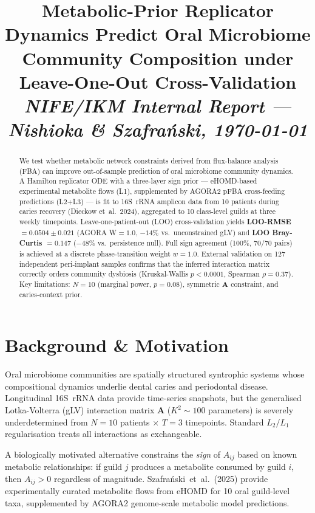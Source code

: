 \documentclass[10pt,a4paper]{article}
\title{%
  \textbf{Metabolic-Prior Replicator Dynamics Predict Oral Microbiome\\
  Community Composition under Leave-One-Out Cross-Validation}\\[6pt]
  \large \textit{NIFE/IKM Internal Report --- Nishioka \& Szafra\'{n}ski, \today}
}
\author{}
\date{}
\newcommand{\bA}{\mathbf{A}}
\begin{document}
\maketitle\thispagestyle{fancy}
\vspace{-1em}

\begin{abstract}
\noindent
We test whether metabolic network constraints derived from flux-balance analysis (FBA)
can improve out-of-sample prediction of oral microbiome community dynamics.
A Hamilton replicator ODE with a three-layer sign prior --- eHOMD-based experimental
metabolite flows (L1), supplemented by AGORA2 pFBA cross-feeding predictions (L2+L3) ---
is fit to 16S~rRNA amplicon data from 10 patients during caries recovery (Dieckow et~al.~2024),
aggregated to 10 class-level guilds at three weekly timepoints.
Leave-one-patient-out (LOO) cross-validation yields
\textbf{LOO-RMSE $= 0.0504 \pm 0.021$} (AGORA W$=1.0$, $-14\%$ vs.\ unconstrained gLV)
and \textbf{LOO Bray-Curtis $= 0.147$} ($-48\%$ vs.\ persistence null).
Full sign agreement (100\%, 70/70 pairs) is achieved at a discrete phase-transition
weight $w=1.0$.
External validation on 127 independent peri-implant samples confirms that the inferred
interaction matrix correctly orders community dysbiosis
(Kruskal-Wallis $p < 0.0001$, Spearman $\rho = 0.37$).
Key limitations: $N=10$ (marginal power, $p=0.08$), symmetric $\bA$ constraint,
and caries-context prior.
\end{abstract}

\tableofcontents\bigskip

\section{Background \& Motivation}

Oral microbiome communities are spatially structured syntrophic systems whose
compositional dynamics underlie dental caries and periodontal disease.
Longitudinal 16S~rRNA data provide time-series snapshots, but the generalised
Lotka-Volterra (gLV) interaction matrix $\bA$ ($K^2 \sim 100$ parameters) is
severely underdetermined from $N=10$ patients $\times$ $T=3$ timepoints.
Standard $L_2/L_1$ regularisation treats all interactions as exchangeable.

A biologically motivated alternative constrains the \emph{sign} of $A_{ij}$
based on known metabolic relationships: if guild $j$ produces a metabolite
consumed by guild $i$, then $A_{ij}>0$ regardless of magnitude.
Szafra\'{n}ski~et~al.\ (2025) provide experimentally curated metabolite flows
from eHOMD for 10 oral guild-level taxa, supplemented by AGORA2 genome-scale
metabolic model predictions.
\end{document}
